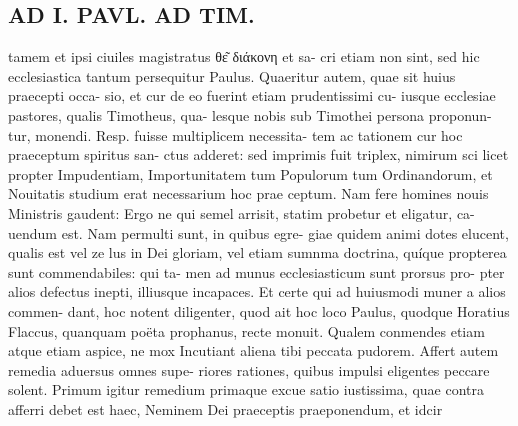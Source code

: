 \documentclass{article}
\begin{document}
\begin{pages}
\section*{AD I. PAVL. AD TIM. }
\marginpar{[ p.338 ]}tamem et ipsi ciuiles magistratus θε͂ διάκονη et sa- cri etiam non sint, sed hic ecclesiastica tantum persequitur Paulus. Quaeritur autem, quae sit huius praecepti occa- sio, et cur de eo fuerint etiam prudentissimi cu- iusque ecclesiae pastores, qualis Timotheus, qua- lesque nobis sub Timothei persona proponun- tur, monendi. Resp. fuisse multiplicem necessita- tem ac tationem cur hoc praeceptum spiritus san- ctus adderet: sed imprimis fuit triplex, nimirum sci licet propter Impudentiam, Importunitatem tum Populorum tum Ordinandorum, et Nouitatis studium erat necessarium hoc prae ceptum. Nam fere homines nouis Ministris gaudent: Ergo ne qui semel arrisit, statim probetur et eligatur, ca- uendum est. Nam permulti sunt, in quibus egre- giae quidem animi dotes elucent, qualis est vel ze lus in Dei gloriam, vel etiam sumnma doctrina, quíque propterea sunt commendabiles: qui ta- men ad munus ecclesiasticum sunt prorsus pro- pter alios defectus inepti, illiusque incapaces. Et certe qui ad huiusmodi muner a alios commen- dant, hoc notent diligenter, quod ait hoc loco Paulus, quodque Horatius Flaccus, quanquam poëta prophanus, recte monuit. Qualem conmendes etiam atque etiam aspice, ne mox Incutiant aliena tibi peccata pudorem. Affert autem remedia aduersus omnes supe- riores rationes, quibus impulsi eligentes peccare solent. Primum igitur remedium primaque excue satio iustissima, quae contra afferri debet est haec, Neminem Dei praeceptis praeponendum, et idcir 

\end{pages}
\end{document}
